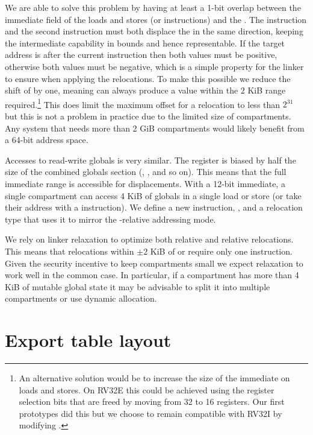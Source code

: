 We are able to solve this problem by having at least a 1-bit overlap between the immediate field of the loads and stores (or  instructions) and the .
The  instruction and the second instruction must both displace the \PCC{} in the same direction, keeping the intermediate capability in bounds and hence representable.
If the target address is after the current instruction then both values must be positive, otherwise both values must be negative, which is a simple property for the linker to ensure when applying the relocations.
To make this possible we reduce the shift of  by one, meaning  can always produce a value within the $2$ KiB range required.\footnote{An alternative solution would be to increase the size of the immediate on loads and stores.
On RV32E this could be achieved using the register selection bits that are freed by moving from 32 to 16 registers.
Our first prototypes did this but we choose to remain compatible with RV32I by modifying .
}
This does limit the maximum offset for a relocation to less than $2^{31}$ but this is not a problem in practice due to the limited size of compartments.
Any system that needs more than 2 GiB compartments would likely benefit from a 64-bit address space.

Accesses to read-write globals is very similar.
The \CGP{} register is biased by half the size of the combined globals section (, , and so on).
This means that the full immediate range is accessible for displacements.
With a 12-bit immediate, a single compartment can access 4 KiB of globals in a single load or store (or take their address with a  instruction).
We define a new instruction, , and a relocation type that uses it to mirror the \PCC-relative addressing mode.

We rely on linker relaxation to optimize both \PCC{} relative and \CGP{} relative relocations.
This means that relocations within $\pm2$ KiB of \PC{} or \CGP{} require only one instruction.
Given the security incentive to keep compartments small we expect relaxation to work well in the common case.
In particular, if a compartment has more than 4 KiB of mutable global state it may be advisable to split it into multiple compartments or use dynamic allocation.

\section{Export table layout}

